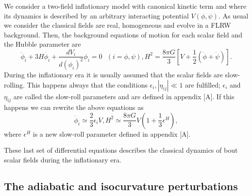 \documentclass[amssymb,twocolumn,prd,nofootinbib,showpacs]{revtex4-1}
\begin{document}
We consider a two-field inflationary model with canonical kinetic term and where its dynamics is described by an arbitrary interacting potential $V(\phi,\psi)$. As usual we consider the classical fields are real, homogeneous and evolve in a FLRW background. Then, the background equations of motion for each scalar field and the Hubble parameter are
\begin{subequations}
\begin{equation}\label{KGEq}
\ddot{\phi}_i+3H\dot{\phi_i}+\frac{dV_i}{d(\phi_i)^2}\phi_i=0 \ \ \ (i=\phi,\psi),
\end{equation}
\begin{equation}
H^2=\frac{8\pi G}{3}\left[V+\frac{1}{2}\left(\dot{\phi}+\dot\psi\right)\right].
\end{equation}
\end{subequations}
During the inflationary era it is usually assumed that the scalar fields are slow-rolling. This happens always that the conditions $\epsilon_i,|\eta_{ij}|\ll 1$ are fulfilled; $\epsilon_i$ and $\eta_{ij}$ are called the slow-roll parameters and are defined in appendix [A]. If this happens we can rewrite the above equations as
\begin{subequations}
\begin{equation}
\dot{\phi}_i\simeq \frac{2}{3}\epsilon_i V,
\end{equation}
\begin{equation}
H^2\simeq \frac{8\pi G}{3}V\left(1+\frac{1}{3}\epsilon^H\right),
\end{equation}
\end{subequations}
where $\epsilon^H$ is a new slow-roll parameter defined in appendix [A]. 

These last set of differential equations describes the classical dynamics of bout scalar fields during the inflationary era.
\subsection{The adiabatic and isocurvature perturbations}
\end{document}
